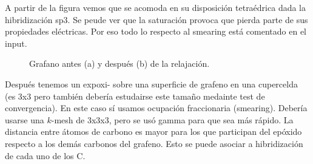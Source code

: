   A partir de la figura vemos que se acomoda en su disposición tetraédrica dada la hibridización sp3. Se peude ver que la saturación provoca que pierda parte de sus propiedades eléctricas. Por eso todo lo respecto al smearing está comentado en el input.

  \begin{figure}[H]
      \centering
       \caption{Grafano antes (a) y después (b) de la relajación.}
   \end{figure}

  Después tenemos un expoxi- sobre una superficie de grafeno en una cupercelda (es 3x3 pero también debería estudairse este tamaño medainte test de convergencia). En este caso sí usamos ocupación fraccionaria (smearing). Debería usarse una $k$-mesh de 3x3x3, pero se usó gamma para que sea más rápido. La distancia entre átomos de carbono es mayor para los que participan del epóxido respecto a los demás carbonos del grafeno. Esto se puede asociar a hibridización de cada uno de los C.

